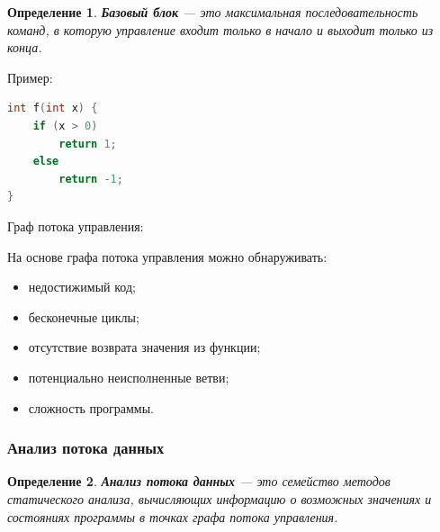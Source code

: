 \documentclass[12pt,a4paper]{article}
\newtheorem{definition}{Определение}
\begin{document}
\begin{definition}
\textbf{Базовый блок} --- это максимальная последовательность команд, в которую управление входит только в начало и выходит только из конца.
\end{definition}

Пример:

\begin{lstlisting}[language=C]
int f(int x) {
    if (x > 0)
        return 1;
    else
        return -1;
}
\end{lstlisting}

Граф потока управления:

\begin{center}
\end{center}

На основе графа потока управления можно обнаруживать:

\begin{itemize}
  \item недостижимый код;
  \item бесконечные циклы;
  \item отсутствие возврата значения из функции;
  \item потенциально неисполненные ветви;
  \item сложность программы.
\end{itemize}

\subsubsection{Анализ потока данных}

\begin{definition}
\textbf{Анализ потока данных} --- это семейство методов статического анализа, вычисляющих информацию о возможных значениях и состояниях программы в точках графа потока управления.
\end{definition}
\end{document}
